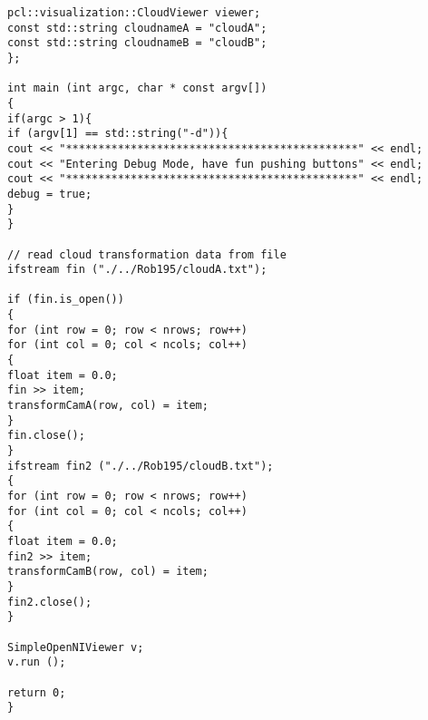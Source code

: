 \begin{lstlisting}[frame = single, label={lst:cppread1}]
pcl::visualization::CloudViewer viewer;
const std::string cloudnameA = "cloudA";
const std::string cloudnameB = "cloudB";
};

int main (int argc, char * const argv[])
{
if(argc > 1){
if (argv[1] == std::string("-d")){
cout << "*********************************************" << endl;
cout << "Entering Debug Mode, have fun pushing buttons" << endl;
cout << "*********************************************" << endl;
debug = true;
}
}

// read cloud transformation data from file
ifstream fin ("./../Rob195/cloudA.txt");

if (fin.is_open())
{
for (int row = 0; row < nrows; row++)
for (int col = 0; col < ncols; col++)
{
float item = 0.0;
fin >> item;
transformCamA(row, col) = item;
}
fin.close();
}
ifstream fin2 ("./../Rob195/cloudB.txt");
{
for (int row = 0; row < nrows; row++)
for (int col = 0; col < ncols; col++)
{
float item = 0.0;
fin2 >> item;
transformCamB(row, col) = item;
}
fin2.close();
}

SimpleOpenNIViewer v;
v.run ();

return 0;
}


\end{lstlisting}